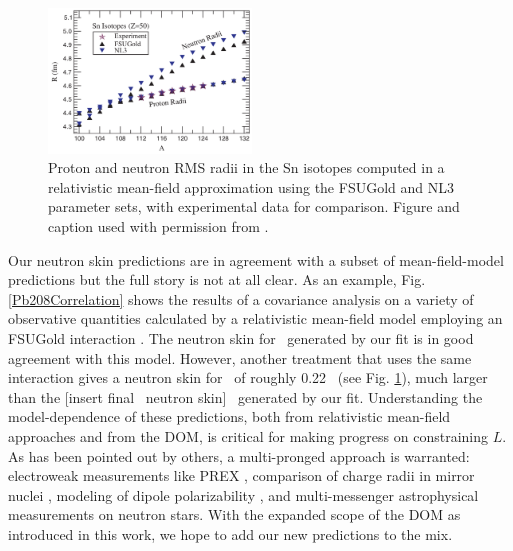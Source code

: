 \begin{figure}
    \centering
    \includegraphics[width=0.48\textwidth]{figures/Piekarewicz2006SnIsotopes.png}
    \caption[Proton and neutron RMS radii in the Sn isotopes computed with FSUGold and NL3
    interactions]
    {
        Proton and neutron RMS radii in the Sn isotopes computed in a relativistic mean-field
        approximation using the FSUGold and NL3 parameter sets, with experimental data for comparison.
        Figure and caption used with permission from \cite{Piekarewicz2006}.
    }
    \label{Piekarewicz2006SnIsotopes}
\end{figure}
Our neutron skin predictions are in agreement with a subset of mean-field-model predictions
but the full story is not at all clear. As an example, Fig. \ref{Pb208Correlation}
shows the results of a covariance
analysis on a variety of observative quantities calculated by a relativistic mean-field model 
employing an FSUGold interaction \cite{Fattoyev2012}. The neutron
skin for \pbEight\ generated by our fit is in good agreement with this model.
However, another treatment that uses the same interaction
\cite{Piekarewicz2006} gives a neutron skin for \snFour\ of roughly 0.22
\femto\meter\ (see Fig. \ref{Piekarewicz2006SnIsotopes}), much larger than the
[insert final \snFour\ neutron skin] \femto\meter\ generated by our fit.
Understanding the model-dependence of these predictions, both from relativistic mean-field
approaches and from the DOM, is critical for making progress on constraining
$L$. As has been pointed out by others, a multi-pronged approach 
is warranted: electroweak measurements like PREX \cite{Horowitz2014}, comparison of
charge radii in mirror nuclei \cite{Brown2017}, modeling of dipole
polarizability \cite{Piekarewicz2006}, and multi-messenger astrophysical
measurements on neutron stars. With the expanded scope of the DOM as introduced in
this work, we hope to add our new predictions to the mix.

